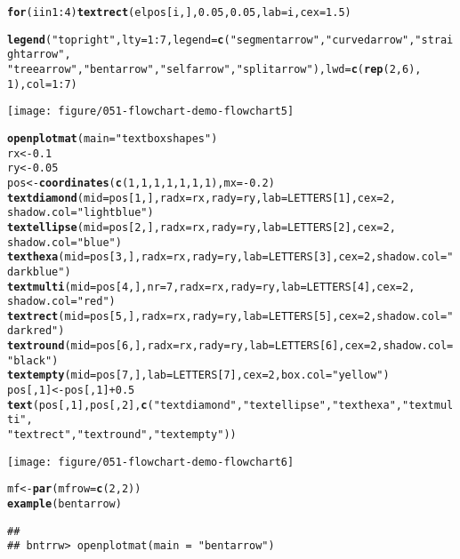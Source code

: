 \documentclass{article}\usepackage[]{graphicx}\usepackage[]{color}
\makeatletter
\def\maxwidth{ %
  \ifdim\Gin@nat@width>\linewidth
    \linewidth
  \else
    \Gin@nat@width
  \fi
}
\newcommand{\hlfunctioncall}[1]{\textcolor[rgb]{0.501960784313725,0,0.329411764705882}{\textbf{#1}}}%
\newcommand{\hlstring}[1]{\textcolor[rgb]{0.6,0.6,1}{#1}}%
\newenvironment{kframe}{%
 \def\at@end@of@kframe{}%
 \ifinner\ifhmode%
  \def\at@end@of@kframe{\end{minipage}}%
  \begin{minipage}{\columnwidth}%
 \fi\fi%
 \def\FrameCommand##1{\hskip\@totalleftmargin \hskip-\fboxsep
 \colorbox{shadecolor}{##1}\hskip-\fboxsep
     \hskip-\linewidth \hskip-\@totalleftmargin \hskip\columnwidth}%
 \MakeFramed {\advance\hsize-\width
   \@totalleftmargin\z@ \linewidth\hsize
   \@setminipage}}%
 {\par\unskip\endMakeFramed%
 \at@end@of@kframe}
\newenvironment{knitrout}{}{} %
\makeatother
\begin{document}
\begin{knitrout}
\begin{kframe}
\begin{alltt}
\hlfunctioncall{for} (i in 1:4) \hlfunctioncall{textrect}(elpos[i, ], 0.05, 0.05, lab = i, cex = 1.5)

\hlfunctioncall{legend}(\hlstring{"topright"}, lty = 1:7, legend = \hlfunctioncall{c}(\hlstring{"segmentarrow"}, \hlstring{"curvedarrow"}, \hlstring{"straightarrow"}, 
    \hlstring{"treearrow"}, \hlstring{"bentarrow"}, \hlstring{"selfarrow"}, \hlstring{"splitarrow"}), lwd = \hlfunctioncall{c}(\hlfunctioncall{rep}(2, 6), 
    1), col = 1:7)
\end{alltt}
\end{kframe}
\texttt{[image: figure/051-flowchart-demo-flowchart5]} 
\begin{kframe}\begin{alltt}

\hlfunctioncall{openplotmat}(main = \hlstring{"textbox shapes"})
rx <- 0.1
ry <- 0.05
pos <- \hlfunctioncall{coordinates}(\hlfunctioncall{c}(1, 1, 1, 1, 1, 1, 1), mx = -0.2)
\hlfunctioncall{textdiamond}(mid = pos[1, ], radx = rx, rady = ry, lab = LETTERS[1], cex = 2, 
    shadow.col = \hlstring{"lightblue"})
\hlfunctioncall{textellipse}(mid = pos[2, ], radx = rx, rady = ry, lab = LETTERS[2], cex = 2, 
    shadow.col = \hlstring{"blue"})
\hlfunctioncall{texthexa}(mid = pos[3, ], radx = rx, rady = ry, lab = LETTERS[3], cex = 2, shadow.col = \hlstring{"darkblue"})
\hlfunctioncall{textmulti}(mid = pos[4, ], nr = 7, radx = rx, rady = ry, lab = LETTERS[4], cex = 2, 
    shadow.col = \hlstring{"red"})
\hlfunctioncall{textrect}(mid = pos[5, ], radx = rx, rady = ry, lab = LETTERS[5], cex = 2, shadow.col = \hlstring{"darkred"})
\hlfunctioncall{textround}(mid = pos[6, ], radx = rx, rady = ry, lab = LETTERS[6], cex = 2, shadow.col = \hlstring{"black"})
\hlfunctioncall{textempty}(mid = pos[7, ], lab = LETTERS[7], cex = 2, box.col = \hlstring{"yellow"})
pos[, 1] <- pos[, 1] + 0.5
\hlfunctioncall{text}(pos[, 1], pos[, 2], \hlfunctioncall{c}(\hlstring{"textdiamond"}, \hlstring{"textellipse"}, \hlstring{"texthexa"}, \hlstring{"textmulti"}, 
    \hlstring{"textrect"}, \hlstring{"textround"}, \hlstring{"textempty"}))
\end{alltt}
\end{kframe}
\texttt{[image: figure/051-flowchart-demo-flowchart6]} 
\begin{kframe}\begin{alltt}


mf <- \hlfunctioncall{par}(mfrow = \hlfunctioncall{c}(2, 2))
\hlfunctioncall{example}(bentarrow)
\end{alltt}
\begin{verbatim}
## 
## bntrrw> openplotmat(main = "bentarrow")


\end{verbatim}
\end{kframe}
\end{knitrout}
\end{document}
